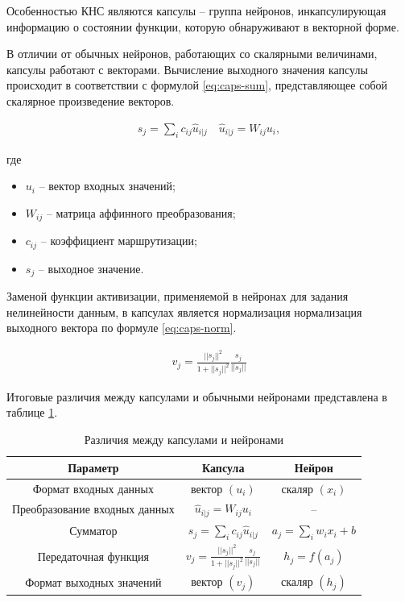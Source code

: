 Особенностью КНС являются капсулы -- группа нейронов, инкапсулирующая информацию о состоянии функции, которую обнаруживают в векторной форме. 

В отличии от обычных нейронов, работающих со скалярными величинами, капсулы работают с векторами. Вычисление выходного значения капсулы происходит в соответствии с формулой \ref{eq:caps-sum}, представляющее собой скалярное произведение векторов.

\begin{eqnarray}\label{eq:caps-sum}
s_j = \sum_{i}c_{ij}\hat{u}_{i|j} \quad	\hat{u}_{i|j} = W_{ij}u_i,
\end{eqnarray}

где

\begin{itemize}
	\item $u_i$ -- вектор входных значений;
	\item $W_{ij}$ -- матрица аффинного преобразования;
	\item $c_{ij}$ -- коэффициент маршрутизации;
	\item $s_j$ -- выходное значение.
\end{itemize}

Заменой функции активизации, применяемой в нейронах для задания нелинейности данным, в капсулах является нормализация нормализация выходного вектора по формуле \ref{eq:caps-norm}.


\begin{eqnarray}\label{eq:caps-norm}
v_j = \frac{{||s_j||}^2}{1 + {||s_j||}^2} \frac{s_j}{||s_j||}
\end{eqnarray}

Итоговые различия между капсулами и обычными нейронами представлена в таблице \ref{tab:caps2trad}.

\begin{table}[!h]
	\caption{\label{tab:caps2trad}Различия между капсулами и нейронами}
	\begin{center}
		\begin{tabular}{|c|c|c|}
			\hline
			Параметр & Капсула & Нейрон \\
			\hline
			Формат входных данных & вектор $(u_i)$ & скаляр $(x_i)$ \\
			\hline
			Преобразование входных данных & $\hat{u}_{i|j} = W_{ij}u_i$ & -- \\
			\hline
			Сумматор & $s_j = \sum_{i}c_{ij}\hat{u}_{i|j}$ & $a_j = \sum_{i}w_ix_i + b$ \\
			\hline
			Передаточная функция & $v_j=\frac{{||s_j||}^2}{1 + {||s_j||}^2}\frac{s_j}{||s_j||}$ & $h_j=f(a_j)$ \\
			\hline
			Формат выходных значений & вектор $(v_j)$ & скаляр $(h_j)$ \\
			\hline
		\end{tabular}
	\end{center}
\end{table}

